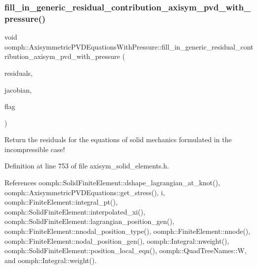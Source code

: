 \subsubsection{\texorpdfstring{fill\+\_\+in\+\_\+generic\+\_\+residual\+\_\+contribution\+\_\+axisym\+\_\+pvd\+\_\+with\+\_\+pressure()}{fill\_in\_generic\_residual\_contribution\_axisym\_pvd\_with\_pressure()}}
{\footnotesize\ttfamily void oomph\+::\+Axisymmetric\+P\+V\+D\+Equations\+With\+Pressure\+::fill\+\_\+in\+\_\+generic\+\_\+residual\+\_\+contribution\+\_\+axisym\+\_\+pvd\+\_\+with\+\_\+pressure (\begin{DoxyParamCaption}\item[{\hyperlink{classoomph_1_1Vector}{Vector}$<$ double $>$ \&}]{residuals,  }\item[{\hyperlink{classoomph_1_1DenseMatrix}{Dense\+Matrix}$<$ double $>$ \&}]{jacobian,  }\item[{unsigned}]{flag }\end{DoxyParamCaption})\hspace{0.3cm}{\ttfamily [inline]}}



Return the residuals for the equations of solid mechanics formulated in the incompressible case! 



Definition at line 753 of file axisym\+\_\+solid\+\_\+elements.\+h.



References oomph\+::\+Solid\+Finite\+Element\+::dshape\+\_\+lagrangian\+\_\+at\+\_\+knot(), oomph\+::\+Axisymmetric\+P\+V\+D\+Equations\+::get\+\_\+stress(), i, oomph\+::\+Finite\+Element\+::integral\+\_\+pt(), oomph\+::\+Solid\+Finite\+Element\+::interpolated\+\_\+xi(), oomph\+::\+Solid\+Finite\+Element\+::lagrangian\+\_\+position\+\_\+gen(), oomph\+::\+Finite\+Element\+::nnodal\+\_\+position\+\_\+type(), oomph\+::\+Finite\+Element\+::nnode(), oomph\+::\+Finite\+Element\+::nodal\+\_\+position\+\_\+gen(), oomph\+::\+Integral\+::nweight(), oomph\+::\+Solid\+Finite\+Element\+::position\+\_\+local\+\_\+eqn(), oomph\+::\+Quad\+Tree\+Names\+::W, and oomph\+::\+Integral\+::weight().

\mbox{\label{classoomph_1_1AxisymmetricPVDEquationsWithPressure_af74b386309449d7022b9599674d58088}} 
